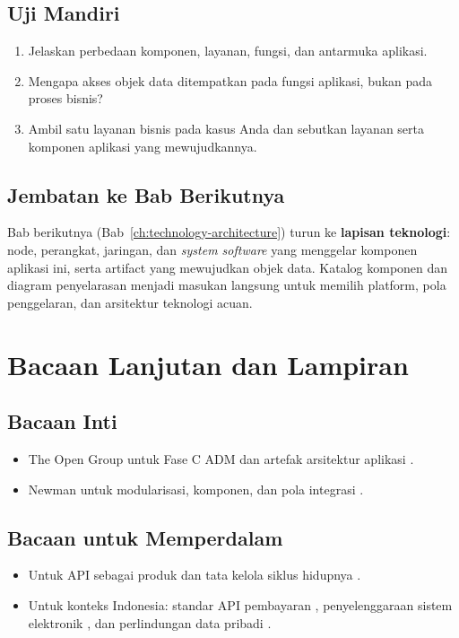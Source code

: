 \subsection*{Uji Mandiri}
\begin{enumerate}
  \item Jelaskan perbedaan komponen, layanan, fungsi, dan antarmuka aplikasi.
  \item Mengapa akses objek data ditempatkan pada fungsi aplikasi, bukan pada
        proses bisnis?
  \item Ambil satu layanan bisnis pada kasus Anda dan sebutkan layanan serta
        komponen aplikasi yang mewujudkannya.
\end{enumerate}

\subsection*{Jembatan ke Bab Berikutnya}
Bab berikutnya (Bab~\ref{ch:technology-architecture}) turun ke \textbf{lapisan
teknologi}: node, perangkat, jaringan,
dan \emph{system software} yang menggelar komponen aplikasi ini, serta artifact
yang mewujudkan objek data. Katalog komponen dan diagram penyelarasan menjadi
masukan langsung untuk memilih platform, pola penggelaran, dan arsitektur
teknologi acuan.

\section{Bacaan Lanjutan dan Lampiran}

\subsection*{Bacaan Inti}
\begin{itemize}
  \item The Open Group untuk Fase C ADM dan artefak arsitektur aplikasi
        \cite{togaf10}.
  \item Newman untuk modularisasi, komponen, dan pola integrasi
        \cite{newman2021building}.
\end{itemize}

\subsection*{Bacaan untuk Memperdalam}
\begin{itemize}
  \item Untuk API sebagai produk dan tata kelola siklus hidupnya
        \cite{jacobson2011apis,medjaoui2018continuous}.
  \item Untuk konteks Indonesia: standar API pembayaran \cite{snapbi},
        penyelenggaraan sistem elektronik \cite{pp712019}, dan perlindungan data
        pribadi \cite{uupdp2022}.
\end{itemize}

